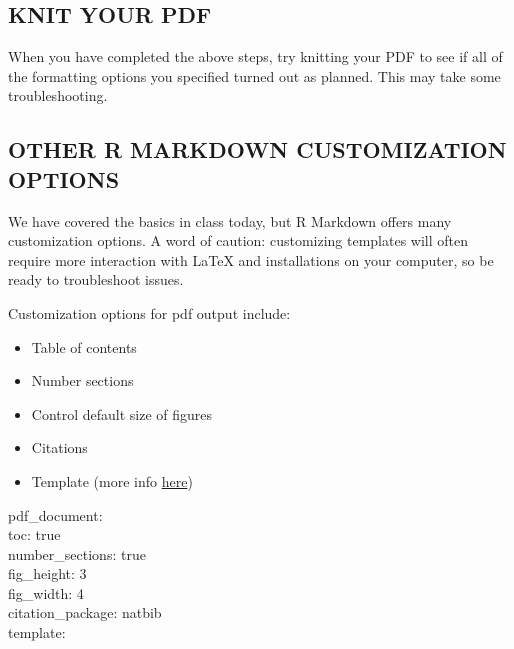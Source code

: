 \documentclass[]{article}
\providecommand{\tightlist}{%
  \setlength{\itemsep}{0pt}\setlength{\parskip}{0pt}}
\begin{document}
\hypertarget{knit-your-pdf}{%
\subsection{KNIT YOUR PDF}\label{knit-your-pdf}}

When you have completed the above steps, try knitting your PDF to see if
all of the formatting options you specified turned out as planned. This
may take some troubleshooting.

\hypertarget{other-r-markdown-customization-options}{%
\subsection{OTHER R MARKDOWN CUSTOMIZATION
OPTIONS}\label{other-r-markdown-customization-options}}

We have covered the basics in class today, but R Markdown offers many
customization options. A word of caution: customizing templates will
often require more interaction with LaTeX and installations on your
computer, so be ready to troubleshoot issues.

Customization options for pdf output include:

\begin{itemize}
\tightlist
\item
  Table of contents
\item
  Number sections
\item
  Control default size of figures
\item
  Citations
\item
  Template (more info
  \href{http://jianghao.wang/post/2017-12-08-rmarkdown-templates/}{here})
\end{itemize}

pdf\_document:\\
toc: true\\
number\_sections: true\\
fig\_height: 3\\
fig\_width: 4\\
citation\_package: natbib\\
template:
\end{document}
